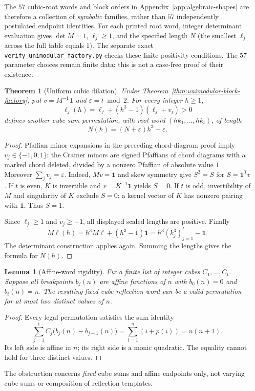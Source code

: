 \documentclass[10pt]{article}
\newtheorem{theorem}{Theorem}
\newtheorem{lemma}{Lemma}
\begin{document}
The $57$ cubic-root words and block orders
in Appendix~\ref{app:algebraic-shapes}
are therefore a collection of \emph{symbolic}
families, rather than $57$ independently
postulated endpoint identities.
For each printed root word,
integer determinant evaluation gives
$\det M=1$, $\ell_j\ge1$, and the
specified length $N$ (the smallest
$\ell_j$ across the full table equals $1$).
The separate exact
\texttt{verify\_unimodular\_factory.py}
checks these finite positivity conditions.
The $57$ parameter choices remain finite data:
this is not a case-free proof of their existence.

\begin{theorem}[Uniform cubic dilation]
\label{thm:unimodular-dilation}
Under Theorem~\ref{thm:unimodular-block-factory},
put $v=M^{-1}\boldsymbol1$ and
$\varepsilon=t\bmod2$. For every integer $h\ge1$,
\[
\ell_j(h)=\ell_j+
(h^3-1)(\ell_j+v_j)>0
\]
defines another cube-sum permutation, with
root word $(hk_1,\ldots,hk_t)$, of length
\[
\boxed{N(h)=(N+\varepsilon)h^3-\varepsilon.}
\]
\end{theorem}
\begin{proof}
Pfaffian minor expansions in the preceding
chord-diagram proof imply
$v_j\in\{-1,0,1\}$: the Cramer minors
are signed Pfaffians of chord diagrams
with a marked chord deleted, divided
by a nonzero Pfaffian of absolute value $1$.
Moreover $\sum_j v_j=\varepsilon$.
Indeed, $Mv=\boldsymbol1$ and skew symmetry
give $S^2=S$ for $S=\boldsymbol1^Tv$.
If $t$ is even, $K$ is invertible and
$v=K^{-1}\boldsymbol1$ yields $S=0$.
If $t$ is odd, invertibility of $M$ and
singularity of $K$ exclude $S=0$:
a kernel vector of $K$ has nonzero pairing
with $\boldsymbol1$. Thus $S=1$.

Since $\ell_j\ge1$ and $v_j\ge-1$,
all displayed scaled lengths are positive.
Finally
\[
M\ell(h)=h^3M\ell+(h^3-1)\boldsymbol1
=h^3(k_j^3)_{j=1}^t-\boldsymbol1.
\]
The determinant construction applies again.
Summing the lengths gives the formula
for $N(h)$.
\end{proof}

\begin{lemma}[Affine-word rigidity]\label{lem:rigid}
Fix a finite list of integer cubes $C_1,\ldots,C_t$.
Suppose all breakpoints $b_j(n)$ are affine
functions of $n$ with $b_0(n)=0$ and $b_t(n)=n$.
The resulting fixed-cube reflection word can
be a valid permutation for at most two distinct
values of $n$.
\end{lemma}
\begin{proof}
Every legal permutation satisfies the sum identity
\[
 \sum_{j=1}^{t} C_j\bigl(b_j(n)-b_{j-1}(n)\bigr)
 =\sum_{i=1}^n(i+p(i))=n(n+1).
\]
Its left side is affine in $n$; its right
side is a monic quadratic. The equality
cannot hold for three distinct values.
\end{proof}
The obstruction concerns \emph{fixed} cube sums
and affine endpoints only, not varying cube
sums or composition of reflection templates.
\end{document}
